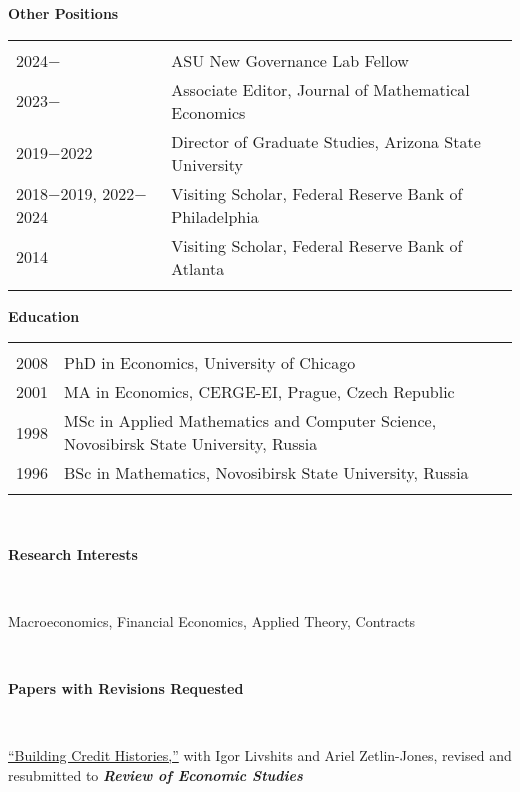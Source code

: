 \documentclass[11pt]{article}
\begin{document}
\textbf{Other Positions}

\begin{tabular}{l l}
 \hspace{.1in} & \\
 2024$-$ & ASU New Governance Lab Fellow\\
 2023$-$ & Associate Editor, Journal of Mathematical Economics\\

2019$-$2022 & Director of Graduate Studies, Arizona State University\\
2018$-$2019, 2022$-$2024 & Visiting Scholar, Federal Reserve Bank of Philadelphia  \\
2014 & Visiting Scholar, 
Federal Reserve Bank of Atlanta \\
 \hspace{.1in} \\
\end{tabular}

\textbf{Education}

\begin{tabular}{l l}
 \hspace{.1in} & \\
2008  & PhD in Economics, University of Chicago\\
2001 & MA in Economics, CERGE-EI, Prague, Czech Republic \\
1998 & MSc in Applied Mathematics and Computer Science, Novosibirsk State University, Russia\\
1996 & BSc in Mathematics, Novosibirsk State University, Russia \\
 \hspace{.1in} & \\
\end{tabular}

\ \

\textbf{Research Interests}

\ \

Macroeconomics, Financial Economics, Applied Theory, Contracts 

\ \ 
\medskip



\textbf{Papers with Revisions Requested}




\ \


\href{http://www.public.asu.edu/~nkovrijn/BCH.pdf}{``Building Credit Histories,''} with Igor Livshits and Ariel Zetlin-Jones, revised and resubmitted to {\bf\textit{Review of Economic Studies}}
\end{document}
